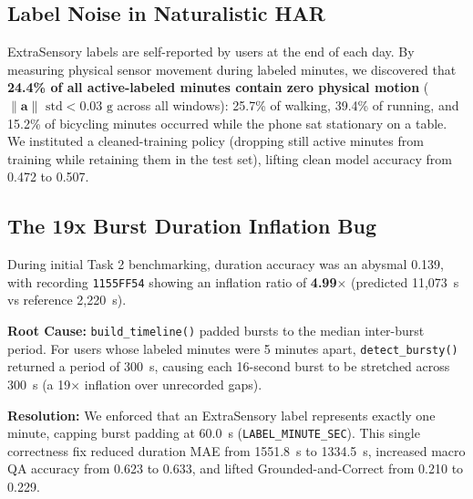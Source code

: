 \documentclass[11pt,a4paper]{article}
\begin{document}
\subsection{Label Noise in Naturalistic HAR}
ExtraSensory labels are self-reported by users at the end of each day. By measuring physical sensor movement during labeled minutes, we discovered that \textbf{24.4\% of all active-labeled minutes contain zero physical motion} ($\|\mathbf{a}\|\text{ std} < 0.03\text{ g}$ across all windows): 25.7\% of walking, 39.4\% of running, and 15.2\% of bicycling minutes occurred while the phone sat stationary on a table. We instituted a cleaned-training policy (dropping still active minutes from training while retaining them in the test set), lifting clean model accuracy from 0.472 to 0.507.

\subsection{The 19x Burst Duration Inflation Bug}
During initial Task 2 benchmarking, duration accuracy was an abysmal 0.139, with recording \texttt{1155FF54} showing an inflation ratio of \textbf{4.99$\times$} (predicted 11,073~s vs reference 2,220~s). 

\textbf{Root Cause:} \texttt{build\_timeline()} padded bursts to the median inter-burst period. For users whose labeled minutes were 5 minutes apart, \texttt{detect\_bursty()} returned a period of 300~s, causing each 16-second burst to be stretched across 300~s (a 19$\times$ inflation over unrecorded gaps). 

\textbf{Resolution:} We enforced that an ExtraSensory label represents exactly one minute, capping burst padding at 60.0~s (\texttt{LABEL\_MINUTE\_SEC}). This single correctness fix reduced duration MAE from 1551.8~s to 1334.5~s, increased macro QA accuracy from 0.623 to 0.633, and lifted Grounded-and-Correct from 0.210 to 0.229.
\end{document}
